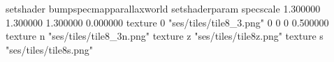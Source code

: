 setshader bumpspecmapparallaxworld
setshaderparam specscale 1.300000 1.300000 1.300000 0.000000
texture 0 "ses/tiles/tile8_3.png" 0 0 0 0.500000
texture n "ses/tiles/tile8_3n.png"
texture z "ses/tiles/tile8z.png"
texture s "ses/tiles/tile8s.png"

